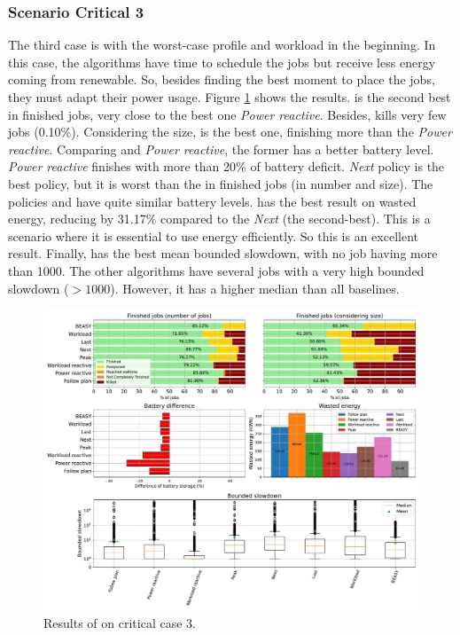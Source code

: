 \clearpage

\subsubsection{Scenario Critical 3}

The third case is with the worst-case profile and workload in the beginning. In this case, the algorithms have time to schedule the jobs but receive less energy coming from renewable. So, besides finding the best moment to place the jobs, they must adapt their power usage. Figure \ref{fig:beasy_critical_3} shows the results. \emph{\systemName} is the second best in finished jobs, very close to the best one \emph{Power reactive}. Besides, \emph{\systemName} kills very few jobs (0.10\%). Considering the size, \emph{\systemName} is the best one, finishing more than the \emph{Power reactive}. Comparing \emph{\systemName} and \emph{Power reactive}, the former has a better battery level. \emph{Power reactive} finishes with more than 20\% of battery deficit. \emph{Next} policy is the best policy, but it is worst than the \emph{\systemName} in finished jobs (in number and size). The policies and \emph{\systemName} have quite similar battery levels. \emph{\systemName} has the best result on wasted energy, reducing by 31.17\% compared to the \emph{Next} (the second-best). This is a scenario where it is essential to use energy efficiently. So this is an excellent result. Finally, \emph{\systemName} has the best mean bounded slowdown, with no job having more than 1000. The other algorithms have several jobs with a very high bounded slowdown ($>1000$). However, it has a higher median than all baselines.

\begin{figure}[!htb]
    \centering
    \includegraphics[scale=0.39]{Images/Heuristic/profile_worst_workload_1_with_noise.pdf}
    \caption{Results of \emph{\systemName} on critical case 3.}
    \label{fig:beasy_critical_3}
\end{figure}

